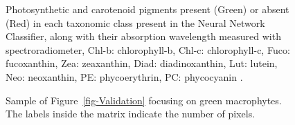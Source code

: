 \documentclass[
  number]{elsarticle}
\begin{document}
\label{cell-fig-Pigm}
\begin{figure}[H]


\caption{\label{fig-Pigm}Photosynthetic and carotenoid pigments present
(Green) or absent (Red) in each taxonomic class present in the Neural
Network Classifier, along with their absorption wavelength measured with
spectroradiometer, Chl-b: chlorophyll-b, Chl-c: chlorophyll-c, Fuco:
fucoxanthin, Zea: zeaxanthin, Diad: diadinoxanthin, Lut: lutein, Neo:
neoxanthin, PE: phycoerythrin, PC: phycocyanin
\citetext{\citealp{ralph2002}; \citealp[
\citep{christensen1977seaweeds}]{Douay2022}; \citealp{cartaxana2016regulation}; \citealp{meleder2013vivo}}.}

\end{figure}%

\label{cell-fig-ValidationGreen}
\begin{figure}[H]


\caption{\label{fig-ValidationGreen}Sample of
Figure~\ref{fig-Validation} focusing on green macrophytes. The labels
inside the matrix indicate the number of pixels.}

\end{figure}%
\end{document}
